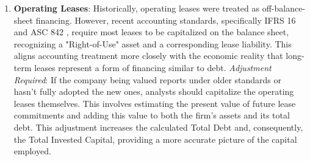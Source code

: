 \begin{enumerate}
    \item \textbf{Operating Leases}: Historically, operating leases were treated as off-balance-sheet financing. However, recent accounting standards, specifically IFRS 16 \parencite{ifrs16} and ASC 842 \parencite{asc842}, require most leases to be capitalized on the balance sheet, recognizing a "Right-of-Use" asset and a corresponding lease liability. This aligns accounting treatment more closely with the economic reality that long-term leases represent a form of financing similar to debt.
          \textit{Adjustment Required}: If the company being valued reports under older standards or hasn't fully adopted the new ones, analysts should capitalize the operating leases themselves. This involves estimating the present value of future lease commitments and adding this value to both the firm's assets and its total debt. This adjustment increases the calculated Total Debt and, consequently, the Total Invested Capital, providing a more accurate picture of the capital employed.


\end{enumerate}
